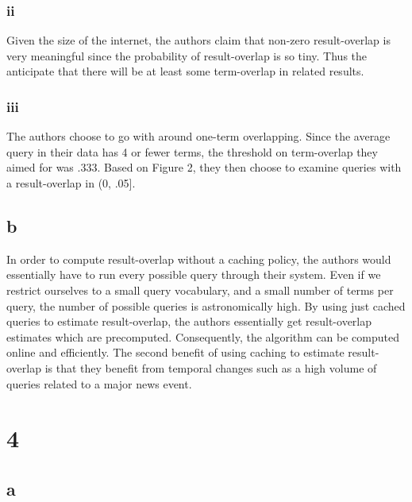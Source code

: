 \documentclass[paper=a4, fontsize=11pt]{scrartcl}
\begin{document}
\subsubsection*{ii}

Given the size of the internet, the authors claim that non-zero result-overlap
is very meaningful since the probability of result-overlap is so tiny. Thus
the anticipate that there will be at least some term-overlap in related
results.

\subsubsection*{iii}

The authors choose to go with around one-term overlapping. Since the average
query in their data has 4 or fewer terms, the threshold on term-overlap they
aimed for was .333. Based on Figure 2, they then choose to examine queries with
a result-overlap in (0, .05].

\subsection*{b}

In order to compute result-overlap without a caching policy, the authors would
essentially have to run every possible query through their system. Even if we
restrict ourselves to a small query vocabulary, and a small number of terms
per query, the number of possible queries is astronomically high. By using
just cached queries to estimate result-overlap, the authors essentially get
result-overlap estimates which are precomputed. Consequently, the algorithm
can be computed online and efficiently. The second benefit of using caching to
estimate result-overlap is that they benefit from temporal changes such as a
high volume of queries related to a major news event.

\section*{4}

\subsection*{a}
\end{document}
